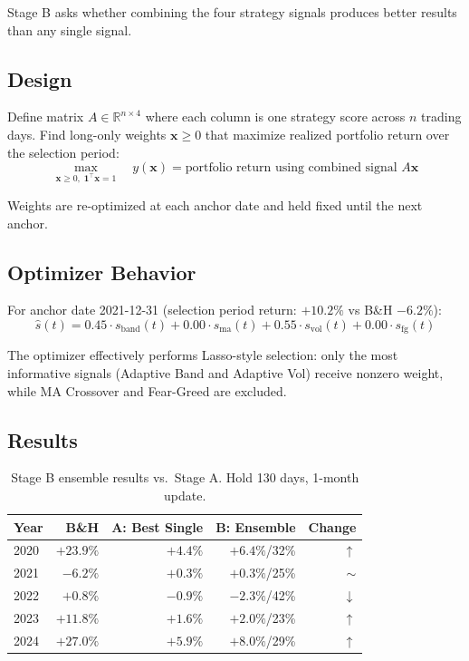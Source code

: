 \documentclass[11pt, letterpaper]{article}
\begin{document}
Stage B asks whether combining the four strategy signals produces better results
than any single signal.

\subsection{Design}

Define matrix $A \in \mathbb{R}^{n \times 4}$ where each column is one strategy
score across $n$ trading days. Find long-only weights $\mathbf{x} \geq 0$ that
maximize realized portfolio return over the selection period:
\[
  \max_{\mathbf{x} \geq 0,\; \mathbf{1}^\top \mathbf{x} = 1}
  \quad y(\mathbf{x}) = \text{portfolio return using combined signal } A\mathbf{x}
\]

Weights are re-optimized at each anchor date and held fixed until the next anchor.

\subsection{Optimizer Behavior}

For anchor date 2021-12-31 (selection period return: $+10.2\%$ vs B\&H $-6.2\%$):
\[
  \hat{s}(t) = 0.45 \cdot s_{\text{band}}(t)
             + 0.00 \cdot s_{\text{ma}}(t)
             + 0.55 \cdot s_{\text{vol}}(t)
             + 0.00 \cdot s_{\text{fg}}(t)
\]

The optimizer effectively performs Lasso-style selection: only the most informative
signals (Adaptive Band and Adaptive Vol) receive nonzero weight, while MA
Crossover and Fear-Greed are excluded.

\subsection{Results}

\begin{table}[h]
\centering
\caption{Stage B ensemble results vs.\ Stage A. Hold 130 days, 1-month update.}
\label{tab:stageB}
\begin{tabular}{lrrrr}
\toprule
Year & B\&H    & A: Best Single & B: Ensemble & Change \\
\midrule
2020 & $+23.9\%$ & $+4.4\%$ & $+6.4\%$/32\%  & $\uparrow$ \\
2021 & $-6.2\%$  & $+0.3\%$ & $+0.3\%$/25\%  & $\sim$ \\
2022 & $+0.8\%$  & $-0.9\%$ & $-2.3\%$/42\%  & $\downarrow$ \\
2023 & $+11.8\%$ & $+1.6\%$ & $+2.0\%$/23\%  & $\uparrow$ \\
2024 & $+27.0\%$ & $+5.9\%$ & $+8.0\%$/29\%  & $\uparrow$ \\
\bottomrule
\end{tabular}
\end{table}
\end{document}

